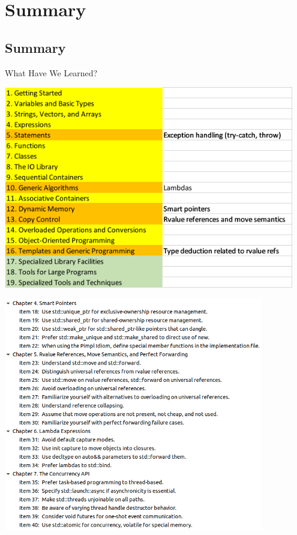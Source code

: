 \section{Summary}

\subsection{Summary}

\begin{frame}{What Have We Learned?}
    \begin{center}
        \includegraphics[width = 0.95\textwidth]{img/contents.png}
    \end{center}
\end{frame}

\begin{frame}
    \begin{center}
        \includegraphics[width=0.85\textwidth]{img/effectivemodern.png}
    \end{center}
\end{frame}

